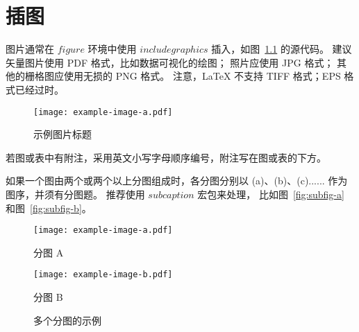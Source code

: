 
\chapter{插图} %

图片通常在 $figure$ 环境中使用 $includegraphics$ 插入，如图~\ref{fig:example} 的源代码。
建议矢量图片使用 PDF 格式，比如数据可视化的绘图；
照片应使用 JPG 格式；
其他的栅格图应使用无损的 PNG 格式。
注意，LaTeX 不支持 TIFF 格式；EPS 格式已经过时。

\begin{figure}[htbp]
	\centering
	\texttt{[image: example-image-a.pdf]}
	\caption{示例图片标题} %
	\label{fig:example} %
\end{figure}

若图或表中有附注，采用英文小写字母顺序编号，附注写在图或表的下方。

如果一个图由两个或两个以上分图组成时，各分图分别以 (a)、(b)、(c)...... 作为图序，并须有分图题。
推荐使用 $subcaption$ 宏包来处理， 比如图~\ref{fig:subfig-a} 和图~\ref{fig:subfig-b}。

\begin{figure}[htbp]
	\centering
	\begin{minipage}{0.44\linewidth}
		\centering
		\texttt{[image: example-image-a.pdf]}
		\caption{分图 A}
		\label{fig:subfig-a}
	\end{minipage}
	\centering
	\begin{minipage}{0.44\linewidth}
		\centering
		\texttt{[image: example-image-b.pdf]}
		\caption{分图 B}
		\label{fig:subfig-b}
	\end{minipage}
	\caption{多个分图的示例}
	\label{fig:multi-image}
\end{figure}